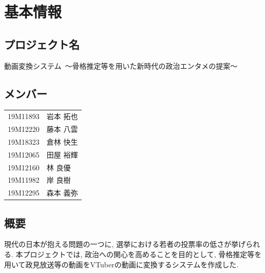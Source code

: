 \documentclass[a4paper,12pt]{jsarticle}
\title{}
\author{}
\date{}
\begin{document}
\section{基本情報}
\subsection{プロジェクト名}
{\large 動画変換システム\ 〜骨格推定等を用いた新時代の政治エンタメの提案〜}

\subsection{メンバー}
\begin{table}[H]
    \begin{tabular}{cl}
        19M11893 & 岩本 拓也\\
        19M12220 & 藤本 八雲\\
        19M18323 & 倉林 快生\\
        19M12065 & 田屋 裕輝\\
        19M12160 & 林 良優\\
        19M11982 & 岸 良樹\\
        19M12295 & 森本 義弥
	\end{tabular}
\end{table}

\subsection{概要}

現代の日本が抱える問題の一つに, 選挙における若者の投票率の低さが挙げられる.
本プロジェクトでは, 政治への関心を高めることを目的として, 骨格推定等を用いて政見放送等の動画をVTuberの動画に変換するシステムを作成した.
\end{document}
